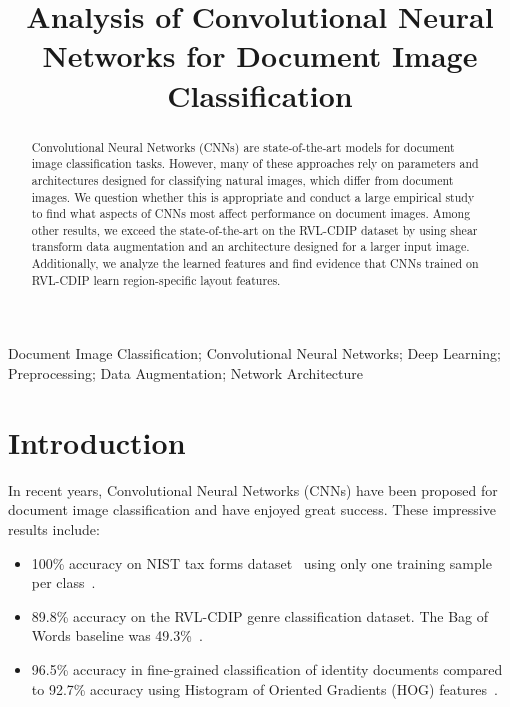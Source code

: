 \documentclass[10pt, conference, compsocconf]{IEEEtran}
\begin{document}
\title{Analysis of Convolutional Neural Networks for Document Image Classification}




\author{
}

\maketitle


\begin{abstract}
Convolutional Neural Networks (CNNs) are state-of-the-art models for document image classification tasks.
However, many of these approaches rely on parameters and architectures designed for classifying natural images, which differ from document images.
We question whether this is appropriate and conduct a large empirical study to find what aspects of CNNs most affect performance on document images.
Among other results, we exceed the state-of-the-art on the RVL-CDIP dataset by using shear transform data augmentation and an architecture designed for a larger input image.
Additionally, we analyze the learned features and find evidence that CNNs trained on RVL-CDIP learn region-specific layout features.

\end{abstract}

\begin{IEEEkeywords}
Document Image Classification; Convolutional Neural Networks; Deep Learning; Preprocessing; Data Augmentation; Network Architecture

\end{IEEEkeywords}

\section{Introduction}

In recent years, Convolutional Neural Networks (CNNs) have been proposed for document image classification and have enjoyed great success.
These impressive results include: 
\begin{itemize}
\item 100\% accuracy on NIST tax forms dataset~\cite{nist91} using only one training sample per class~\cite{kang14}.
\item 89.8\% accuracy on the RVL-CDIP genre classification dataset.  The Bag of Words baseline was 49.3\%~\cite{harley15}.
\item 96.5\% accuracy in fine-grained classification of identity documents compared to 92.7\% accuracy using Histogram of Oriented Gradients (HOG) features~\cite{simon15}.
\end{itemize}
\end{document}
